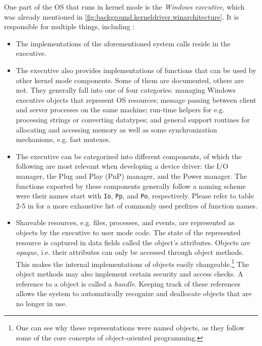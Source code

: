 One part of the OS that runs in kernel mode is the \emph{Windows executive}, which was already mentioned in \autoref{fig:background.kerneldriver.winarchitecture}. It is responsible for multiple things, including \cite{Yosifovich2017}:
\begin{itemize}
	\item The implementations of the aforementioned system calls reside in the executive.
	\item The executive also provides implementations of functions that can be used by other kernel mode components. Some of them are documented, others are not. They generally fall into one of four categories: managing Windows executive objects that represent OS resources; message passing between client and server processes on the same machine; run-time helpers for e.g. processing strings or converting datatypes; and general support routines for allocating and accessing memory as well as some synchronization mechanisms, e.g. fast mutexes.
	\item The executive can be categorized into different components, of which the following are most relevant when developing a device driver: the I/O manager, the Plug and Play (PnP) manager, and the Power manager. The functions exported by these components generally follow a naming scheme were their names start with \texttt{Io}, \texttt{Pp}, and \texttt{Po}, respectively. Please refer to table 2-5 in \cite{Yosifovich2017} for a more exhaustive list of commonly used prefixes of function names.
	\item Shareable resources, e.g. files, processes, and events, are represented as objects by the executive to user mode code. The state of the represented resource is captured in data fields called the object's attributes. Objects are \emph{opaque}, i.e. their attributes can only be accessed through object methods. This makes the internal implementations of objects easily changeable.\footnote{\label{fn:background.kerneldriver.oop} One can see why these representations were named objects, as they follow some of the core concepts of object-oriented programming.} The object methods may also implement certain security and access checks. A reference to a object is called a \emph{handle}. Keeping track of these references allows the system to automatically recognize and deallocate objects that are no longer in use.
\end{itemize}

